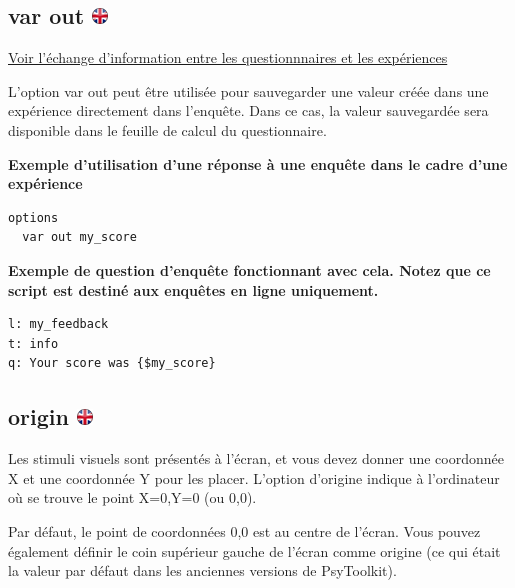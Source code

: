 \documentclass[
]{book}
\begin{document}
\hypertarget{var-out}{%
\subsection[var out ]{\texorpdfstring{var out \href{https://www.psytoolkit.org/doc3.2.0/syntax.html\#_var_out}{\protect\includegraphics{img/ukflag.png}}}{var out }}\label{var-out}}

\protect\hyperlink{s11}{Voir l'échange d'information entre les questionnnaires et les expériences}

L'option var out peut être utilisée pour sauvegarder une valeur créée dans une expérience directement dans l'enquête. Dans ce cas, la valeur sauvegardée sera disponible dans le feuille de calcul du questionnaire.

\textbf{Exemple d'utilisation d'une réponse à une enquête dans le cadre d'une expérience}

\begin{verbatim}
options
  var out my_score
\end{verbatim}

\textbf{Exemple de question d'enquête fonctionnant avec cela. Notez que ce script est destiné aux enquêtes en ligne uniquement.}

\begin{verbatim}
l: my_feedback
t: info
q: Your score was {$my_score}
\end{verbatim}

\hypertarget{origin}{%
\subsection[origin ]{\texorpdfstring{origin \href{https://www.psytoolkit.org/doc3.2.0/syntax.html\#options-origin}{\protect\includegraphics{img/ukflag.png}}}{origin }}\label{origin}}

Les stimuli visuels sont présentés à l'écran, et vous devez donner une coordonnée X et une coordonnée Y pour les placer. L'option d'origine indique à l'ordinateur où se trouve le point X=0,Y=0 (ou 0,0).

Par défaut, le point de coordonnées 0,0 est au centre de l'écran. Vous pouvez également définir le coin supérieur gauche de l'écran comme origine (ce qui était la valeur par défaut dans les anciennes versions de PsyToolkit).
\end{document}
